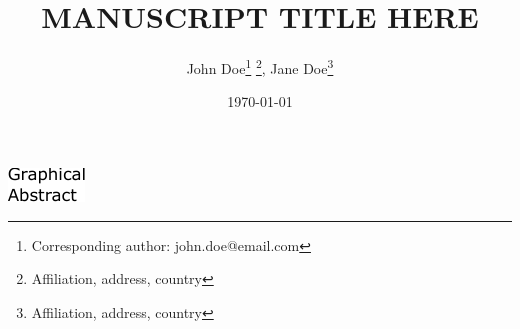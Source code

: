 \documentclass{article}
\title{MANUSCRIPT TITLE HERE}
\author{
    John Doe\thanks{Corresponding author: john.doe@email.com} \thanks{Affiliation, address, country},
    Jane Doe\thanks{Affiliation, address, country}
}
\date{\today}
\begin{document}

\maketitle

\includegraphics[width=\linewidth]{figs/graphical_abstract.pdf}



\clearpage

\begin{abstract}
    
\end{abstract}










\appendix








\end{document}
